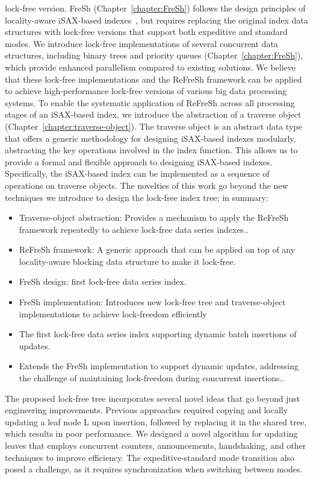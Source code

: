 \documentclass[a4paper,11pt,twoside,openany]{book}
\begin{document}
lock-free version. FreSh (Chapter~\ref{chapter:FreSh}) follows the design principles of locality-aware
iSAX-based indexes~\cite{isaxfamily,PFP21-I}, but requires replacing the original index data structures
with lock-free versions that support both expeditive and standard modes. We introduce lock-free
implementations of several concurrent data structures, including binary trees and priority queues
(Chapter~\ref{chapter:FreSh}), which provide enhanced parallelism compared to existing solutions.
%
We believe that these lock-free implementations and the ReFreSh framework can be applied to
achieve high-performance lock-free versions of various big data processing systems.
%
To enable the systematic application of ReFreSh across all processing stages of an iSAX-based index,
we introduce the abstraction of a traverse object (Chapter~\ref{chapter:traverse-object}). The traverse object
is an abstract data type that offers a generic methodology for designing iSAX-based indexes modularly,
abstracting the key operations involved in the index function. This allows us to provide a
formal and flexible approach to designing iSAX-based indexes.
Specifically, the iSAX-based index can be implemented as a sequence of operations on traverse objects. 
%
The novelties of this work go beyond the new techniques we introduce to design the
lock-free index tree; in summary:
\begin{itemize}
\item Traverse-object abstraction: Provides a mechanism to apply the ReFreSh framework repeatedly to achieve lock-free data 
    series indexes..
\item ReFreSh framework: A generic approach that can be applied on top of any locality-aware blocking data structure to make it lock-free.
\item FreSh design: first lock-free data series index.
\item FreSh implementation: Introduces new lock-free tree and traverse-object implementations to achieve lock-freedom efficiently
\item The first lock-free data series index supporting dynamic batch insertions of updates.
\item Extends the FreSh implementation to support dynamic updates, addressing the challenge of maintaining lock-freedom during concurrent insertions..
\end{itemize}
The proposed lock-free tree incorporates several novel ideas that go beyond just engineering 
improvements. Previous approaches required copying and locally updating a leaf node L upon insertion,
followed by replacing it in the shared tree, which results in poor performance. We designed a novel
algorithm for updating leaves that employs concurrent counters, announcements, handshaking, and
other techniques to improve efficiency. The expeditive-standard mode transition also posed a
challenge, as it requires synchronization when switching between modes.
\end{document}

